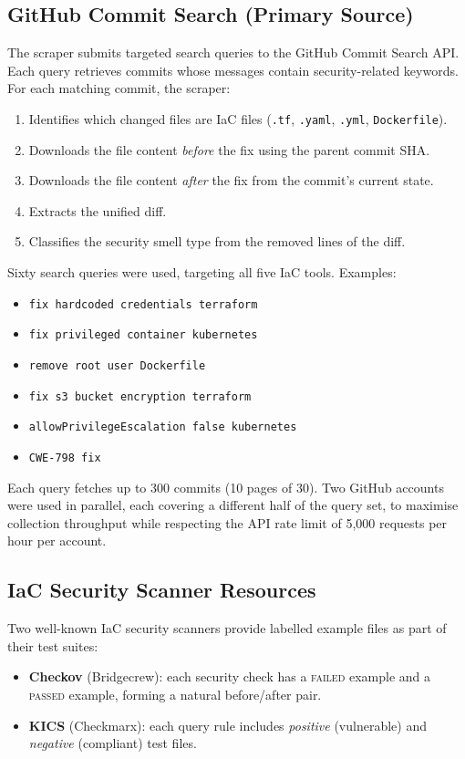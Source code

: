 \documentclass[11pt,a4paper]{article}
\begin{document}
\subsection{GitHub Commit Search (Primary Source)}

The scraper submits targeted search queries to the GitHub Commit Search API. Each query retrieves commits whose messages contain security-related keywords. For each matching commit, the scraper:
\begin{enumerate}[leftmargin=1.5cm]
  \item Identifies which changed files are IaC files (\texttt{.tf}, \texttt{.yaml}, \texttt{.yml}, \texttt{Dockerfile}).
  \item Downloads the file content \emph{before} the fix using the parent commit SHA.
  \item Downloads the file content \emph{after} the fix from the commit's current state.
  \item Extracts the unified diff.
  \item Classifies the security smell type from the removed lines of the diff.
\end{enumerate}

Sixty search queries were used, targeting all five IaC tools. Examples:
\begin{itemize}[leftmargin=1.2cm]
  \item \texttt{fix hardcoded credentials terraform}
  \item \texttt{fix privileged container kubernetes}
  \item \texttt{remove root user Dockerfile}
  \item \texttt{fix s3 bucket encryption terraform}
  \item \texttt{allowPrivilegeEscalation false kubernetes}
  \item \texttt{CWE-798 fix}
\end{itemize}

Each query fetches up to 300 commits (10 pages of 30). Two GitHub accounts were used in parallel, each covering a different half of the query set, to maximise collection throughput while respecting the API rate limit of 5,000 requests per hour per account.

\subsection{IaC Security Scanner Resources}

Two well-known IaC security scanners provide labelled example files as part of their test suites:
\begin{itemize}[leftmargin=1.2cm]
  \item \textbf{Checkov} (Bridgecrew): each security check has a \textsc{failed} example and a \textsc{passed} example, forming a natural before/after pair.
  \item \textbf{KICS} (Checkmarx): each query rule includes \emph{positive} (vulnerable) and \emph{negative} (compliant) test files.
\end{itemize}
\end{document}
